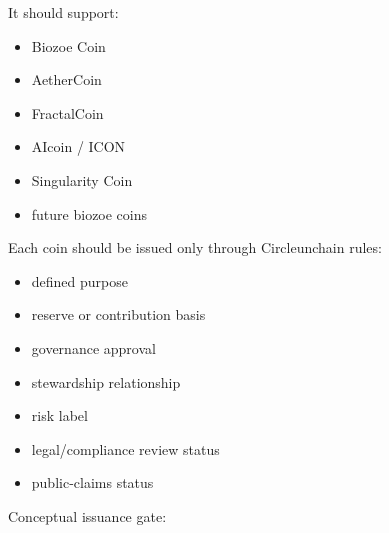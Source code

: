 ﻿\documentclass[12pt]{article}
\begin{document}
It should support:

\begin{itemize}
  \item Biozoe Coin
\end{itemize}
\begin{itemize}
  \item AetherCoin
\end{itemize}
\begin{itemize}
  \item FractalCoin
\end{itemize}
\begin{itemize}
  \item AIcoin / ICON
\end{itemize}
\begin{itemize}
  \item Singularity Coin
\end{itemize}
\begin{itemize}
  \item future biozoe coins
\end{itemize}

Each coin should be issued only through Circleunchain rules:

\begin{itemize}
  \item defined purpose
\end{itemize}
\begin{itemize}
  \item reserve or contribution basis
\end{itemize}
\begin{itemize}
  \item governance approval
\end{itemize}
\begin{itemize}
  \item stewardship relationship
\end{itemize}
\begin{itemize}
  \item risk label
\end{itemize}
\begin{itemize}
  \item legal/compliance review status
\end{itemize}
\begin{itemize}
  \item public-claims status
\end{itemize}

Conceptual issuance gate:
\end{document}
